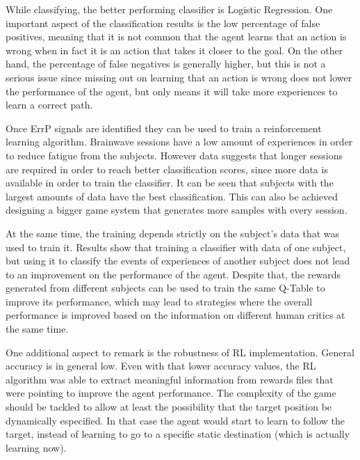 \documentclass[journal]{IEEEtran}
\begin{document}
{{%

While classifying, the better performing classifier is Logistic Regression. One important aspect of the classification results is the low percentage of false positives, meaning that it is not common that the agent learns that an action is wrong when in fact it is an action that takes it closer to the goal. On the other hand, the percentage of false negatives is generally higher, but this is not a serious issue since missing out on learning that an action is wrong does not lower the performance of the agent, but only means it will take more experiences to learn a correct path.

Once ErrP signals are identified they can be used to train a reinforcement learning algorithm. Brainwave sessions have a low amount of experiences in order to reduce fatigue from the subjects. However data suggests that longer sessions are required in order to reach better classification scores, since more data is available in order to train the classifier. It can be seen that subjects with the largest amounts of data have the best classification. This can also be achieved designing a bigger game system that generates more samples with every session.

At the same time, the training depends strictly on the subject's data that was used to train it. Results show that training a classifier with data of one subject, but using it to classify the events of experiences of another subject does not lead to an improvement on the performance of the agent. Despite that, the rewards generated from different subjects can be used to train the same Q-Table to improve its performance, which may lead to strategies where the overall performance is improved based on the information on different human critics at the same time.

One additional aspect to remark is the robustness of RL implementation.  General accuracy is in general low.  Even with that lower accuracy values, the RL algorithm was able to extract meaningful information from rewards files that were pointing to improve the agent performance.  The complexity of the game should be tackled to allow at least the possibility that the target position be dynamically especified.  In that case the agent would start to learn to follow the target, instead of learning to go to a specific static destination (which is actually learning now). 

}}
\end{document}
